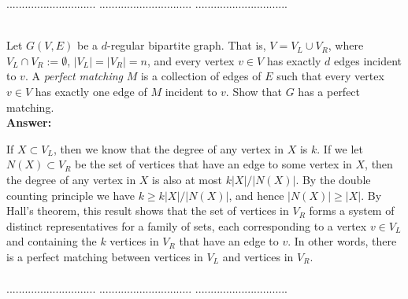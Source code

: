 \documentclass[a4paper,11pt]{article}
\begin{document}
\pagebreak

 $.............................$
 $..............................$
          $..............................$\\

\bigskip

\\
Let $G(V,E)$ be a $d$-regular bipartite graph. 
That is, $V=V_L \cup V_R$, where $V_L \cap V_R := \emptyset$, $|V_L|=|V_R|=n$, 
and every vertex $v\in V$ has exactly $d$ edges incident to $v$. 
A {\em perfect matching} $M$ is a collection of edges of $E$ such that 
every vertex $v\in V$ has exactly one edge of $M$ incident to $v$.
Show that $G$ has a perfect matching.\\
{\bf Answer:} \par
    If $X \subset V_L$, then we know that the degree of any vertex in $X$ is $k$. If we let $N(X) \subset V_R$ be the set of vertices that have an edge to some vertex in $X$, then the degree of any vertex in $X$ is also at most $k|X|/|N(X)|$. By the double counting principle we have $k \geq k|X|/|N(X)|$, and hence $|N(X)| \geq |X|$. By Hall's theorem, this result shows that the set of vertices in $V_R$ forms a system of distinct representatives for a family of sets, each corresponding to a vertex $v \in V_L$ and containing the $k$ vertices in $V_R$ that have an edge to $v$. In other words, there is a perfect matching between vertices in $V_L$ and vertices in $V_R$.
    \begin{align*}
    \end{align*}

\pagebreak

 $.............................$
 $..............................$
          $..............................$\\

\bigskip
\end{document}
